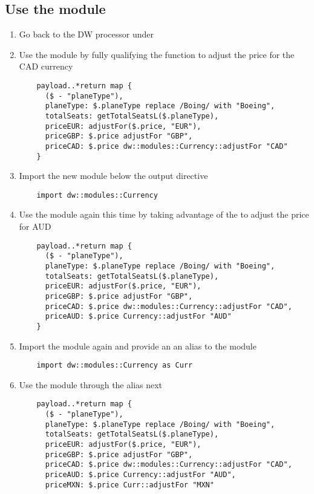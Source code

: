 \subsection{Use the module}
\begin{enumerate}[resume*]
\item Go back to the DW processor under 
\item Use the module by fully qualifying the function to adjust the price for the CAD currency
  \begin{verbatim}
    payload..*return map {
      ($ - "planeType"),
      planeType: $.planeType replace /Boing/ with "Boeing",
      totalSeats: getTotalSeatsL($.planeType),
      priceEUR: adjustFor($.price, "EUR"),
      priceGBP: $.price adjustFor "GBP",
      priceCAD: $.price dw::modules::Currency::adjustFor "CAD"
    }    
  \end{verbatim}
\item Import the new module below the output directive
  \begin{verbatim}
    import dw::modules::Currency
  \end{verbatim}
\item Use the module again this time by taking advantage of the  to adjust the price for AUD
  \begin{verbatim}
    payload..*return map {
      ($ - "planeType"),
      planeType: $.planeType replace /Boing/ with "Boeing",
      totalSeats: getTotalSeatsL($.planeType),
      priceEUR: adjustFor($.price, "EUR"),
      priceGBP: $.price adjustFor "GBP",
      priceCAD: $.price dw::modules::Currency::adjustFor "CAD",
      priceAUD: $.price Currency::adjustFor "AUD"
    }      
  \end{verbatim}
\item Import the module again and provide an an alias to the module
  \begin{verbatim}
    import dw::modules::Currency as Curr
  \end{verbatim}
\item Use the module through the  alias next
  \begin{verbatim}
    payload..*return map {
      ($ - "planeType"),
      planeType: $.planeType replace /Boing/ with "Boeing",
      totalSeats: getTotalSeatsL($.planeType),
      priceEUR: adjustFor($.price, "EUR"),
      priceGBP: $.price adjustFor "GBP",
      priceCAD: $.price dw::modules::Currency::adjustFor "CAD",
      priceAUD: $.price Currency::adjustFor "AUD",
      priceMXN: $.price Curr::adjustFor "MXN"

\end{verbatim}
\end{enumerate}
